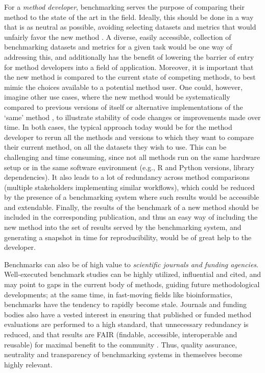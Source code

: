 \documentclass[11pt]{article}
\begin{document}
For a \emph{method developer}, benchmarking serves the purpose of comparing their method to the state of the art in the field. Ideally, this should be done in a way that is as neutral as possible, avoiding selecting datasets and metrics that would unfairly favor the new method \cite{Boulesteix2013-vy, Weber2019-el}. A diverse, easily accessible, collection of benchmarking datasets and metrics for a given task would be one way of addressing this, and additionally has the benefit of lowering the barrier of entry for method developers into a field of application. Moreover, it is important that the new method is compared to the current state of competing methods, to best mimic the choices available to a potential method user. One could, however, imagine other use cases, where the new method would be systematically compared to previous versions of itself or alternative implementations of the `same' method \cite{Rich2024-jh}, to illustrate stability of code changes or improvements made over time. In both cases, the typical approach today would be for the method developer to rerun all the methods and versions to which they want to compare their current method, on all the datasets they wish to use. This can be challenging and time consuming, since not all methods run on the same hardware setup or in the same software environment (e.g., R and Python versions, library dependencies). It also leads to a lot of redundancy across method comparisons (multiple stakeholders implementing similar workflows), which could be reduced by the presence of a benchmarking system where such results would be accessible and extendable. Finally, the results of the benchmark of a new method should be included in the corresponding publication, and thus an easy way of including the new method into the set of results served by the benchmarking system, and generating a snapshot in time for reproducibility, would be of great help to the developer. 

Benchmarks can also be of high value to \emph{scientific journals and funding agencies}. Well-executed benchmark studies can be highly utilized, influential and cited, and may point to gaps in the current body of methods, guiding future methodological developments; at the same time, in fast-moving fields like bioinformatics, benchmarks have the tendency to rapidly become stale. Journals and funding bodies also have a vested interest in ensuring that published or funded method evaluations are performed to a high standard, that unnecessary redundancy is reduced, and that results are FAIR (findable, accessible, interoperable and reusable) for maximal benefit to the community \cite{Wilkinson2016-bh}. Thus, quality assurance, neutrality and transparency of benchmarking systems in themselves become highly relevant. 
\end{document}
